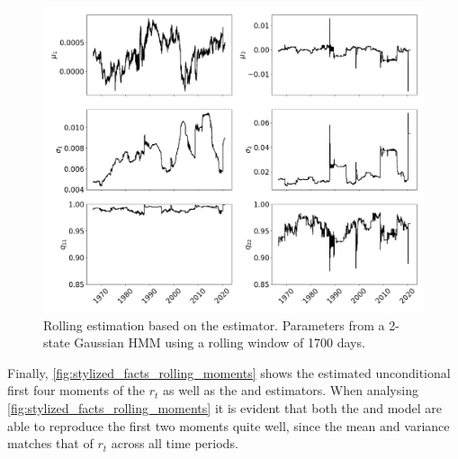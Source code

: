 \begin{figure}[H] 
    \centering
    \includegraphics[width=1.0\textwidth]{analysis/stylized_facts/images/2-state JUMP HMM rolling params.png}
    \caption[Rolling estimation based on the \jump estimator]{Rolling estimation based on the \jump estimator. Parameters from a 2-state Gaussian HMM using a rolling window of 1700 days.}
    \label{fig: Jump estimation rolling parameters} 
\end{figure}

Finally, \cref{fig:stylized_facts_rolling_moments} shows the estimated unconditional first four moments of the $r_t$ as well as the \jump and \mle estimators. When analysing \cref{fig:stylized_facts_rolling_moments} it is evident that both the \mle and \jump model are able to reproduce the first two moments quite well, since the mean and variance matches that of $r_t$ across all time periods.

